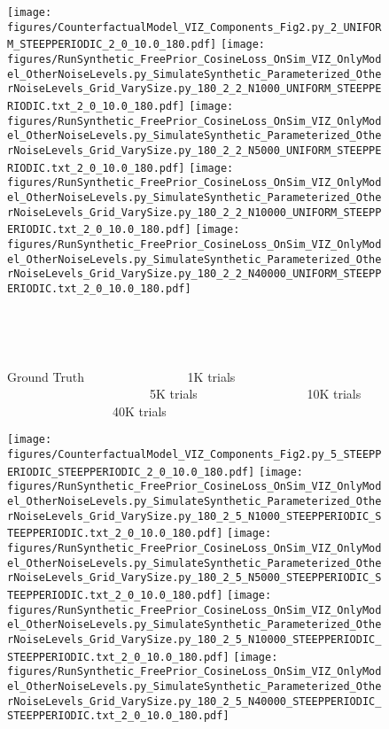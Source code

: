 \documentclass{article}
\begin{document}
\begin{figure}
\texttt{[image: figures/CounterfactualModel\_VIZ\_Components\_Fig2.py\_2\_UNIFORM\_STEEPPERIODIC\_2\_0\_10.0\_180.pdf]}
\texttt{[image: figures/RunSynthetic\_FreePrior\_CosineLoss\_OnSim\_VIZ\_OnlyModel\_OtherNoiseLevels.py\_SimulateSynthetic\_Parameterized\_OtherNoiseLevels\_Grid\_VarySize.py\_180\_2\_2\_N1000\_UNIFORM\_STEEPPERIODIC.txt\_2\_0\_10.0\_180.pdf]}
\texttt{[image: figures/RunSynthetic\_FreePrior\_CosineLoss\_OnSim\_VIZ\_OnlyModel\_OtherNoiseLevels.py\_SimulateSynthetic\_Parameterized\_OtherNoiseLevels\_Grid\_VarySize.py\_180\_2\_2\_N5000\_UNIFORM\_STEEPPERIODIC.txt\_2\_0\_10.0\_180.pdf]}
\texttt{[image: figures/RunSynthetic\_FreePrior\_CosineLoss\_OnSim\_VIZ\_OnlyModel\_OtherNoiseLevels.py\_SimulateSynthetic\_Parameterized\_OtherNoiseLevels\_Grid\_VarySize.py\_180\_2\_2\_N10000\_UNIFORM\_STEEPPERIODIC.txt\_2\_0\_10.0\_180.pdf]}
\texttt{[image: figures/RunSynthetic\_FreePrior\_CosineLoss\_OnSim\_VIZ\_OnlyModel\_OtherNoiseLevels.py\_SimulateSynthetic\_Parameterized\_OtherNoiseLevels\_Grid\_VarySize.py\_180\_2\_2\_N40000\_UNIFORM\_STEEPPERIODIC.txt\_2\_0\_10.0\_180.pdf]}

\ \ 

\ \ 


Ground Truth
  \ \  \ \ \ \  \ \  \ \ \ \ \ \ \ \ 
 1K trials
  \ \  \ \  \ \  \ \ \ \ \ \ \ \ \ \ \ \ \ \ \ \ \  
 5K trials
  \ \  \ \  \ \  \ \ \ \ \ \ \ \ \ \ \ 
 10K trials 
 \ \  \ \  \ \  \ \ \ \ \ \ \ \ \ \ \ 
40K trials
\ \ \ \ \ 


\texttt{[image: figures/CounterfactualModel\_VIZ\_Components\_Fig2.py\_5\_STEEPPERIODIC\_STEEPPERIODIC\_2\_0\_10.0\_180.pdf]}
\texttt{[image: figures/RunSynthetic\_FreePrior\_CosineLoss\_OnSim\_VIZ\_OnlyModel\_OtherNoiseLevels.py\_SimulateSynthetic\_Parameterized\_OtherNoiseLevels\_Grid\_VarySize.py\_180\_2\_5\_N1000\_STEEPPERIODIC\_STEEPPERIODIC.txt\_2\_0\_10.0\_180.pdf]}
\texttt{[image: figures/RunSynthetic\_FreePrior\_CosineLoss\_OnSim\_VIZ\_OnlyModel\_OtherNoiseLevels.py\_SimulateSynthetic\_Parameterized\_OtherNoiseLevels\_Grid\_VarySize.py\_180\_2\_5\_N5000\_STEEPPERIODIC\_STEEPPERIODIC.txt\_2\_0\_10.0\_180.pdf]}
\texttt{[image: figures/RunSynthetic\_FreePrior\_CosineLoss\_OnSim\_VIZ\_OnlyModel\_OtherNoiseLevels.py\_SimulateSynthetic\_Parameterized\_OtherNoiseLevels\_Grid\_VarySize.py\_180\_2\_5\_N10000\_STEEPPERIODIC\_STEEPPERIODIC.txt\_2\_0\_10.0\_180.pdf]}
\texttt{[image: figures/RunSynthetic\_FreePrior\_CosineLoss\_OnSim\_VIZ\_OnlyModel\_OtherNoiseLevels.py\_SimulateSynthetic\_Parameterized\_OtherNoiseLevels\_Grid\_VarySize.py\_180\_2\_5\_N40000\_STEEPPERIODIC\_STEEPPERIODIC.txt\_2\_0\_10.0\_180.pdf]}



\end{figure}
\end{document}
